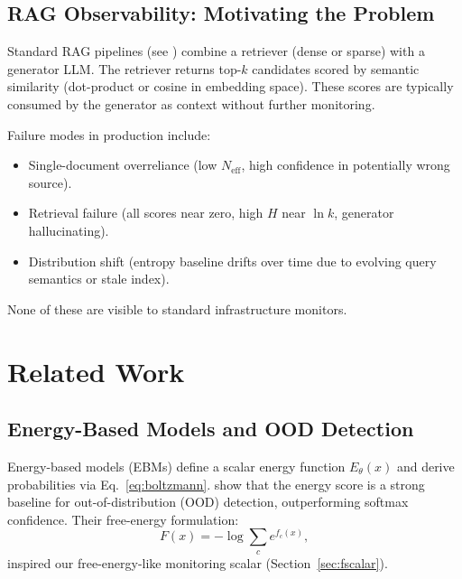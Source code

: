 \documentclass[11pt,a4paper]{article}
\theoremstyle{definition}
\begin{document}
\subsection{RAG Observability: Motivating the Problem}

Standard RAG pipelines (see \citet{lewis2020rag,gao2023ragsurvey})
combine a retriever (dense or sparse) with a generator LLM.
The retriever returns top-$k$ candidates scored by semantic similarity
(dot-product or cosine in embedding space).
These scores are typically consumed by the generator as context without
further monitoring.

Failure modes in production include:
\begin{itemize}[noitemsep]
  \item Single-document overreliance (low $N_\text{eff}$, high confidence
    in potentially wrong source).
  \item Retrieval failure (all scores near zero, high $H$ near $\ln k$,
    generator hallucinating).
  \item Distribution shift (entropy baseline drifts over time due to
    evolving query semantics or stale index).
\end{itemize}
None of these are visible to standard infrastructure monitors.

\section{Related Work}
\label{sec:related}

\subsection{Energy-Based Models and OOD Detection}

Energy-based models (EBMs) \citep{lecun2006} define a scalar energy
function $E_\theta(x)$ and derive probabilities via Eq.~\eqref{eq:boltzmann}.
\citet{liu2020ebm} show that the energy score is a strong baseline for
out-of-distribution (OOD) detection, outperforming softmax confidence.
Their free-energy formulation:
\begin{equation}
  F(x) = -\log \sum_{c} e^{f_c(x)},
  \label{eq:free_energy_ood}
\end{equation}
inspired our free-energy-like monitoring scalar (Section~\ref{sec:fscalar}).
\end{document}
